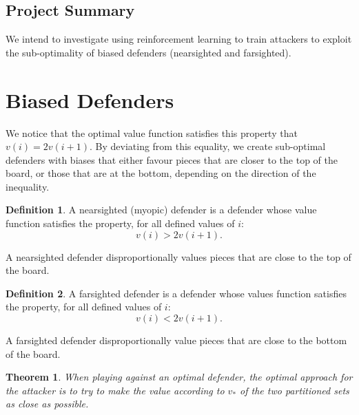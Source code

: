 \documentclass{article}
\theoremstyle{plain}
\newtheorem{thm}{Theorem}[section]
\theoremstyle{definition}
\newtheorem{defn}{Definition}[section]
\theoremstyle{remark}
\begin{document}
\subsection{Project Summary}

We intend to investigate using reinforcement learning to train attackers to exploit the sub-optimality of biased defenders (nearsighted and farsighted).


\section{Biased Defenders} %

We notice that the optimal value function satisfies this property that $v(i) = 2v(i+1)$. By deviating from this equality, we create sub-optimal defenders with biases that either favour pieces that are closer to the top of the board, or those that are at the bottom, depending on the direction of the inequality.

\begin{defn}
A nearsighted (myopic) defender is a defender whose value function satisfies the property, for all defined values of $i$:
\begin{equation}
	v(i) > 2v(i + 1).
\end{equation}
\end{defn}

A nearsighted defender disproportionally values pieces that are close to the top of the board. 

\begin{defn}
A farsighted defender is a defender whose values function satisfies the property, for all defined values of $i$:
\begin{equation}
	v(i) < 2v(i + 1).
\end{equation}
\end{defn}

A farsighted defender disproportionally value pieces that are close to the bottom of the board. \\

\begin{thm}
When playing against an optimal defender, the optimal approach for the attacker is to try to make the value according to $v_{*}$ of the two partitioned sets as close as possible. 
\end{thm}
\end{document}
